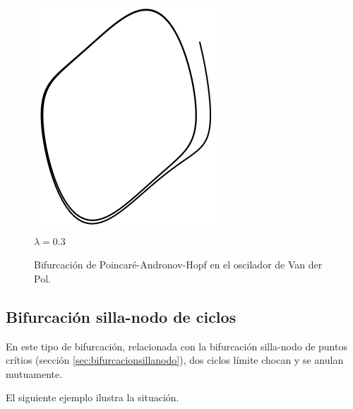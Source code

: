 \documentclass[11pt]{book}
\theoremstyle{definition}
\numberwithin{definition}{section}
\theoremstyle{theorem}
\numberwithin{theorem}{section}
\numberwithin{lemma}{section}
\numberwithin{corollary}{section}
\theoremstyle{plain}
\numberwithin{example}{section}
\begin{document}
\begin{figure}[!ht]
	\includegraphics[scale=0.35]{figures/vanderpol-hopfbifurcation-0_3.png} \\ $\lambda = 0.3$
	\caption{Bifurcación de Poincaré-Andronov-Hopf en el oscilador de Van der Pol.}
\end{figure}

\subsection{Bifurcación silla-nodo de ciclos}
En este tipo de bifurcación, relacionada con la bifurcación silla-nodo de puntos crítios (sección \ref{sec:bifurcacionsillanodo}), dos ciclos límite chocan y se anulan mutuamente.

El siguiente ejemplo ilustra la situación.
\end{document}
